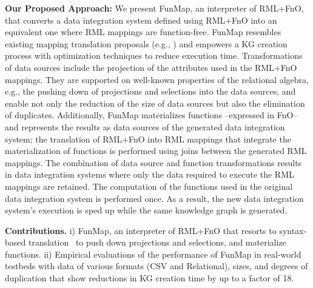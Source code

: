 \noindent \textbf{Our Proposed Approach:} We present FunMap, an interpreter of RML+FnO, that converts a data integration system defined using RML+FnO into an equivalent one where RML mappings are function-free. FunMap resembles existing mapping translation proposals (e.g., \cite{AliW19,corcho2019towards,junior2016funul}) and empowers a KG creation process with optimization techniques to reduce execution time. Transformations of data sources include the projection of the attributes used in the RML+FnO mappings. They are supported on well-known properties of the relational algebra, e.g., the pushing down of projections and selections into the data sources, and enable not only the reduction of the size of data sources but also the elimination of duplicates. Additionally, FunMap materializes functions --expressed in FnO-- and represents the results as data sources of the generated data integration system; the translation of RML+FnO into RML mappings that integrate the materialization of functions is performed using joins between the generated RML mappings. The combination of data source and function transformations results in data integration systems where only the data required to execute the RML mappings are retained. The computation of the functions used in the original data integration system is performed once. As a result, the new data integration system's execution is sped up while the same knowledge graph is generated. 

\noindent\textbf{Contributions.} i) FunMap, an interpreter of RML+FnO that resorts to syntax-based translation~\cite{aho1986compilers} to push down projections and selections, and materialize functions. ii) Empirical evaluations of the performance of FunMap in real-world testbeds with data of various formats (CSV and Relational), sizes, and degrees of duplication that show reductions in KG creation time by up to a factor of 18.

